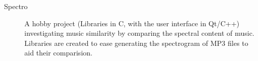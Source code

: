 \begin{description}

\item[Spectro]
A hobby project (Libraries in C, with the user interface in Qt/C++) investigating music similarity by comparing the spectral content of music. Libraries are created to ease generating the spectrogram of MP3 files to aid their comparision.

\end{description}

